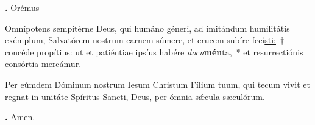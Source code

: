 \textbf{\Vbar.} Orémus

Omnípotens sempitérne Deus, qui humáno géneri, ad imitándum humilitátis exémplum, Salvatórem nostrum carnem súmere, et crucem subíre fecí\underline{sti:}~† concéde propítius: ut et patiéntiae ipsíus habére \textit{docu}\-\textbf{mén}ta,~* et resurrectiónis consórtia mereámur.

Per eúmdem Dóminum nostrum Iesum Christum Fílium tuum, qui tecum vivit et regnat in unitáte Spíritus Sancti, Deus, per ómnia s\'{\ae}cula sæculórum.

\textbf{\Rbar.} Amen.

